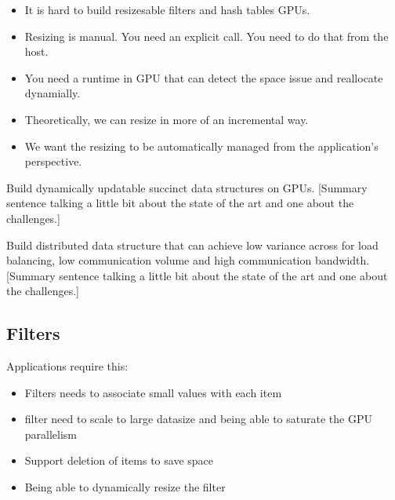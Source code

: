 \begin{itemize}
    \item It is hard to build resizesable filters and hash tables GPUs.
    \item Resizing is manual. You need an explicit call.  You need to do that from the host. 
    \item You need a runtime in GPU that can detect the space issue and reallocate dynamially.
    \item Theoretically, we can resize in more of an incremental way.
    \item We want the resizing to be automatically managed from the application's perspective. 
\end{itemize}


\begin{rproblem}
Build dynamically updatable succinct data structures on GPUs.
[Summary sentence talking a little bit about the state of the art and one about the challenges.]
\label{rprob:peppermint}
\end{rproblem}

\begin{rproblem}
Build distributed data structure that can achieve low variance across for load balancing, low communication volume and high communication bandwidth. 
[Summary sentence talking a little bit about the state of the art and one about the challenges.]
\label{rprob:peppermint}
\end{rproblem}




\subsection{Filters}
Applications require this:
\begin{itemize}
    \item Filters needs to associate small values with each item
    \item filter need to scale to large datasize and being able to saturate the GPU parallelism
    \item Support deletion of items to save space
    \item Being able to dynamically resize the filter
\end{itemize}

